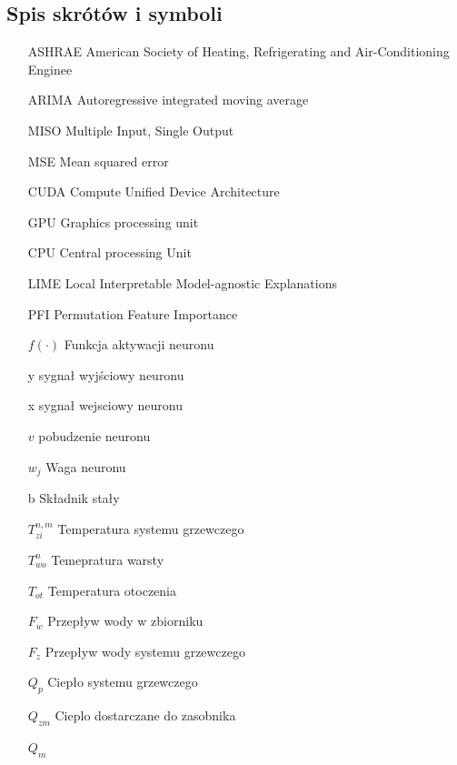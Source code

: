 \documentclass[a4paper,twoside,12pt]{book}
\begin{document}
\backmatter

\printbibliography           %

\begin{appendices}

  \chapter{Spis skrótów i symboli}

  \begin{itemize}
    \item[ASHRAE] American Society of Heating, Refrigerating and Air-Conditioning Enginee
    \item[ARIMA] Autoregressive integrated moving average
    \item[MISO] Multiple Input, Single Output
    \item[MSE] Mean squared error
    \item[CUDA] Compute Unified Device Architecture
    \item[GPU] Graphics processing unit
    \item[CPU] Central processing Unit
    \item[LIME] Local Interpretable Model-agnostic Explanations
    \item[PFI] Permutation Feature Importance
    \item[$f(\cdot)$] Funkcja aktywacji neuronu
    \item[y] sygnał wyjściowy neuronu
    \item[x] sygnał wejsciowy neuronu
    \item[$v$] pobudzenie neuronu
    \item[$w_j$]  Waga neuronu
    \item[b] Składnik stały
    \item[$T_{zi}^{n,m}$] Temperatura systemu grzewczego
    \item[$T_{wo}^{n}$] Temepratura warsty
    \item[$T_{ot}$] Temperatura otoczenia
    \item[$F_w$] Przepływ wody w zbiorniku
    \item[$F_z$] Przepływ wody systemu grzewczego
    \item[$Q_p$] Ciepło systemu grzewczego
    \item[$Q_{zm}$] Cieplo dostarczane do zasobnika
    \item[$Q_m$]

\end{itemize}
\end{appendices}
\end{document}
